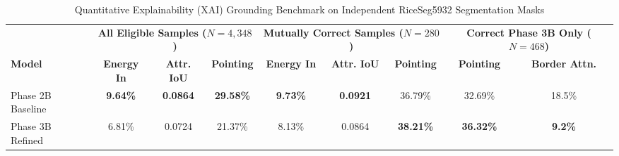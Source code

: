 \begin{table}[t]
\centering
\caption{Quantitative Explainability (XAI) Grounding Benchmark on Independent RiceSeg5932 Segmentation Masks}
\label{tab:xai_results}
\small
\setlength{\tabcolsep}{6pt}
\begin{tabular}{lcccccccc}
\toprule
 & \multicolumn{3}{c}{\textbf{All Eligible Samples ($N=4,348$)}} & \multicolumn{3}{c}{\textbf{Mutually Correct Samples ($N=280$)}} & \multicolumn{2}{c}{\textbf{Correct Phase 3B Only ($N=468$)}} \\
\cmidrule(lr){2-4} \cmidrule(lr){5-7} \cmidrule(lr){8-9}
\textbf{Model} & \textbf{Energy In} & \textbf{Attr. IoU} & \textbf{Pointing} & \textbf{Energy In} & \textbf{Attr. IoU} & \textbf{Pointing} & \textbf{Pointing} & \textbf{Border Attn.} \\
\midrule
Phase 2B Baseline & \textbf{9.64\%} & \textbf{0.0864} & \textbf{29.58\%} & \textbf{9.73\%} & \textbf{0.0921} & 36.79\% & 32.69\% & 18.5\% \\
Phase 3B Refined & 6.81\% & 0.0724 & 21.37\% & 8.13\% & 0.0864 & \textbf{38.21\%} & \textbf{36.32\%} & \textbf{9.2\%} \\
\bottomrule
\end{tabular}
\end{table}

